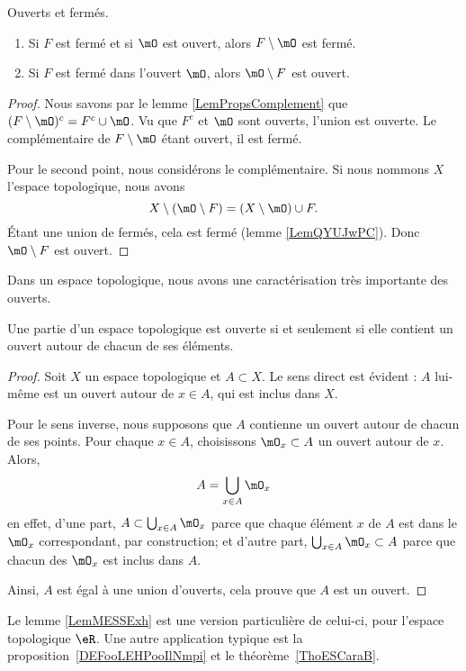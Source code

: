 \begin{lemma}       \label{LEMooSFMZooBguLdf}
	Ouverts et fermés.
	\begin{enumerate}
		\item		\label{ITEMooFPGVooUZHzkA}
		      Si \( F\) est fermé et si \( \mO\) est ouvert, alors \( F\setminus \mO \) est fermé.
		\item		\label{ITEMooULNTooKQyrJb}
		      Si \( F\) est fermé dans l'ouvert \( \mO\), alors \( \mO\setminus F\) est ouvert.
	\end{enumerate}
\end{lemma}

\begin{proof}
	Nous savons par le lemme \ref{LemPropsComplement} que $(F\setminus \mO)^c=F^c\cup\mO$. Vu que \( F^c\) et \( \mO\) sont ouverts, l'union est ouverte. Le complémentaire de \( F\setminus \mO\) étant ouvert, il est fermé.

	Pour le second point, nous considérons le complémentaire. Si nous nommons \( X\) l'espace topologique, nous avons
	\begin{equation}
		X\setminus(\mO\setminus F)=(X\setminus \mO)\cup F.
	\end{equation}
	Étant une union de fermés, cela est fermé (lemme \ref{LemQYUJwPC}). Donc \( \mO\setminus F\) est ouvert.
\end{proof}

Dans un espace topologique, nous avons une caractérisation très importante des ouverts.
\begin{theorem}		\label{ThoPartieOUvpartouv}
	Une partie d'un espace topologique est ouverte si et seulement si elle contient un ouvert autour de chacun de ses éléments.
\end{theorem}

\begin{proof}
	Soit \( X\) un espace topologique et \( A\subset X\). Le sens direct est évident : \( A\) lui-même est un ouvert autour de \( x\in A\), qui est inclus dans \( X\).

	Pour le sens inverse, nous supposons que \( A\) contienne un ouvert autour de chacun de ses points. Pour chaque \( x\in A\), choisissons \( \mO_x\subset A\) un ouvert autour de \( x\). Alors,
	\begin{equation}	\label{EqAUniondesOx}
		A=\bigcup_{x\in A}\mO_x
	\end{equation}
	en effet, d'une part, \( A\subset\bigcup_{x\in A}\mO_x\) parce que chaque élément \( x\) de \( A\) est dans le \( \mO_x\) correspondant, par construction; et d'autre part, \( \bigcup_{x\in A}\mO_x\subset A\) parce que chacun des \( \mO_x\) est inclus dans \( A\).

	Ainsi, \( A\) est égal à une union d'ouverts, cela prouve que \( A\) est un ouvert.
\end{proof}
Le lemme \ref{LemMESSExh} est une version particulière de celui-ci, pour l'espace topologique \( \eR \). Une autre application typique est la proposition~\ref{DEFooLEHPooIlNmpi} et le théorème~\ref{ThoESCaraB}.

